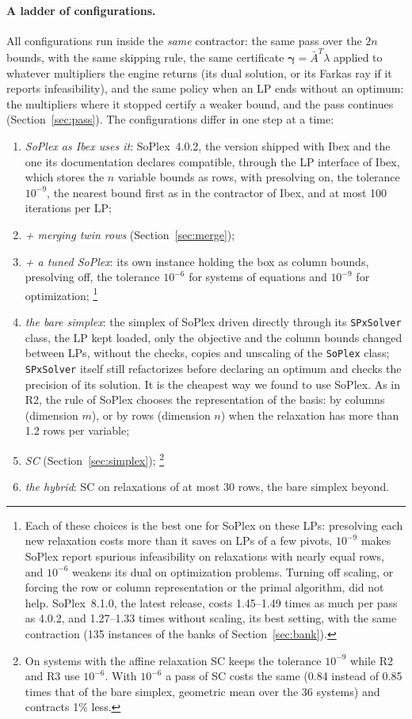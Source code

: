 \documentclass[11pt]{article}
\newcommand{\iv}[1]{\mathbf{#1}}          %
\newcommand{\Abar}{\bar{A}}
\theoremstyle{definition}
\theoremstyle{remark}
\begin{document}
\paragraph{A ladder of configurations.}
All configurations run inside the \emph{same} contractor: the same pass over
the $2n$ bounds, with the same skipping rule, the same certificate
$\iv{\gamma}=\Abar^T\lambda$ applied to whatever multipliers the engine returns
(its dual solution, or its Farkas ray if it reports infeasibility), and the
same policy when an LP ends without an optimum: the multipliers where it
stopped certify a weaker bound, and the pass continues
(Section~\ref{sec:pass}). The configurations differ in one step at a time:
\begin{enumerate}
\item[R0] \emph{SoPlex as Ibex uses it}: SoPlex~4.0.2, the version shipped with
Ibex and the one its documentation declares compatible, through the LP
interface of Ibex, which stores the $n$ variable bounds as rows, with presolving on, the
tolerance $10^{-9}$, the nearest bound first as in the contractor of Ibex, and
at most 100 iterations per LP;
\item[R1] \emph{+ merging twin rows} (Section~\ref{sec:merge});
\item[R2] \emph{+ a tuned SoPlex}: its own instance holding the box as column
bounds, presolving off, the tolerance $10^{-6}$ for systems of equations and
$10^{-9}$ for optimization;%
\footnote{Each of these choices is the best one for SoPlex on these LPs:
presolving each new relaxation costs more than it saves on LPs of a few
pivots, $10^{-9}$ makes SoPlex report spurious infeasibility on relaxations
with nearly equal rows, and $10^{-6}$ weakens its dual on optimization
problems. Turning off scaling, or forcing the row or column representation or
the primal algorithm, did not help. SoPlex~8.1.0, the latest release, costs
1.45--1.49 times as much per pass as 4.0.2, and 1.27--1.33 times without
scaling, its best setting, with the same contraction (135 instances of the
banks of Section~\ref{sec:bank}).}
\item[R3] \emph{the bare simplex}: the simplex of SoPlex driven directly through
its \texttt{SPxSolver} class, the LP kept loaded, only the objective and the
column bounds changed between LPs, without the checks, copies and
unscaling of the \texttt{SoPlex} class; \texttt{SPxSolver} itself still
refactorizes before declaring an optimum and checks the precision of its
solution. It is the cheapest way we found to use SoPlex. As in R2, the rule of SoPlex chooses the representation of the
basis: by columns (dimension $m$), or by rows (dimension $n$) when the
relaxation has more than 1.2 rows per variable;
\item[R4] \emph{SC} (Section~\ref{sec:simplex});%
\footnote{On systems with the affine relaxation SC keeps the tolerance
$10^{-9}$ while R2 and R3 use $10^{-6}$. With $10^{-6}$ a pass of SC costs the
same (0.84 instead of 0.85 times that of the bare simplex, geometric mean over
the 36 systems) and contracts 1\% less.}
\item[R5] \emph{the hybrid}: SC on relaxations of at most 30 rows, the bare
simplex beyond.
\end{enumerate}
\end{document}
